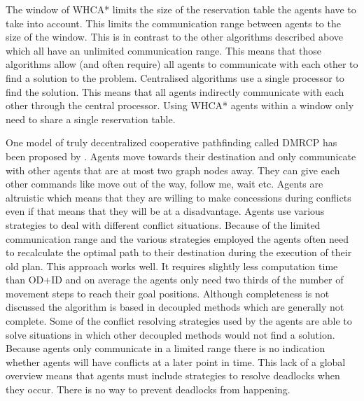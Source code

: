 The window of WHCA* limits the size of the reservation table the agents have to
take into account. This limits the communication range between agents to the
size of the window. This is in contrast to the other algorithms described above
which all have an unlimited communication range. This means that those
algorithms allow (and often require) all agents to communicate with each other
to find a solution to the problem. Centralised algorithms use a single
processor to find the solution. This means that all agents indirectly
communicate with each other through the central processor. Using WHCA* agents
within a window only need to share a single reservation table.

One model of truly decentralized cooperative pathfinding called DMRCP has been
proposed by \cite{wei2016}. Agents move towards their destination and only
communicate with other agents that are at most two graph nodes away. They can
give each other commands like
move out of the way, follow me, wait etc. Agents are altruistic which means
that they are willing to make concessions during conflicts even if that means
that they will be at a disadvantage. Agents use various strategies to deal with
different conflict situations. Because of the limited communication range and
the various strategies employed the agents often need to recalculate the
optimal path to their destination during the execution of their old plan. This
approach works well. It requires slightly less computation time than OD+ID and
on average the agents only need two thirds of the number of movement steps to
reach their goal positions. Although completeness is not discussed the
algorithm is based in decoupled methods which are generally not complete. Some
of the conflict resolving strategies used by the agents are able to solve
situations in which other decoupled methods would not find a solution.
Because agents only communicate in a limited range there is no indication
whether agents will have conflicts at a later point in time. This lack of a
global overview means that agents must include strategies to resolve deadlocks
when they occur. There is no way to prevent deadlocks from happening.

